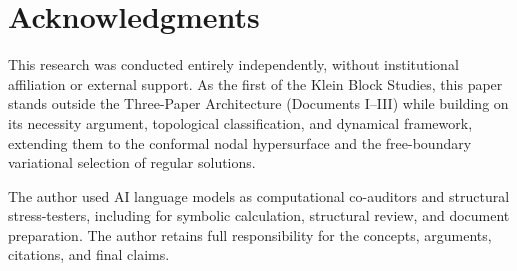 \documentclass[11pt]{article}
\theoremstyle{canonmath}
\theoremstyle{canonpostulate}
\theoremstyle{canonproposition}
\theoremstyle{canonmath}
\theoremstyle{canonproposition}
\begin{document}
\newpage
\section*{Acknowledgments}

This research was conducted entirely independently, without institutional affiliation or external support. As the first of the Klein Block Studies, this paper stands outside the Three-Paper Architecture (Documents I--III) while building on its necessity argument, topological classification, and dynamical framework, extending them to the conformal nodal hypersurface and the free-boundary variational selection of regular solutions.

The author used AI language models as computational co-auditors and structural stress-testers, including for symbolic calculation, structural review, and document preparation. The author retains full responsibility for the concepts, arguments, citations, and final claims.
\end{document}

